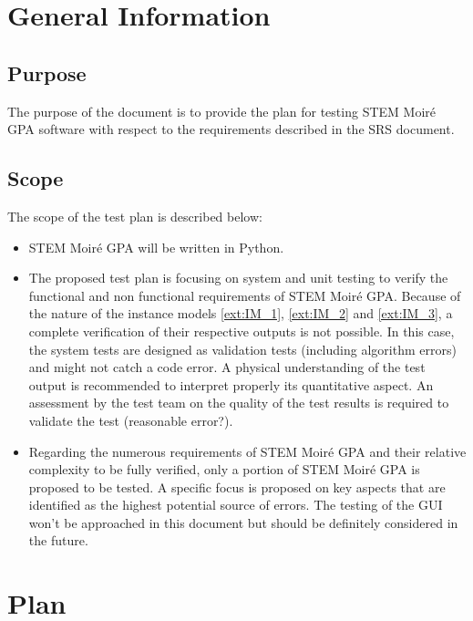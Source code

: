 \documentclass[12pt, titlepage]{article}
\newcommand{\progname}{STEM Moir{\'e} GPA}
\begin{document}
\newpage



\section{General Information}

\subsection{Purpose}

The purpose of the document is to provide the plan for testing \progname{} software with respect to the requirements described in the SRS document. 

\subsection{Scope}

The scope of the test plan is described below:
\begin{itemize}
\item \progname{} will be written in Python.
\item The proposed test plan is focusing on system and unit testing to verify the functional and non functional requirements of \progname{}. Because of the nature of the instance models \cref{ext:IM_1}, \cref{ext:IM_2} and \cref{ext:IM_3}, a complete verification of their respective outputs is not possible. In this case, the system tests are designed as validation tests (including algorithm errors) and might not catch a code error. A physical understanding of the test output is recommended to interpret properly its quantitative aspect. An assessment by the test team on the quality of the test results is required to validate the test (reasonable error?). 
\item Regarding the numerous requirements of \progname{} and their relative complexity to be fully verified, only a portion of \progname{} is proposed to be tested. A specific focus is proposed on key aspects that are identified as the highest potential source of errors. The testing of the GUI won't be approached in this document but should be definitely considered in the future.
\end{itemize}

\section{Plan}
\end{document}
